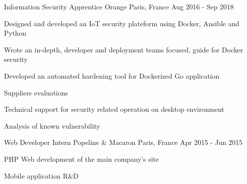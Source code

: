 

\begin{cventries}

  \cventry
    {Information Security Apprentice } %
    {Orange} %
    {Paris, France} %
    {Aug 2016 - Sep 2018} %
    {
      \begin{cvitems} %
        \item {Designed and developed an IoT security plateform using Docker, Ansible and Python}
        \item {Wrote an in-depth, developer and deployment teams focused, guide for Docker security}
        \item {Developed an automated hardening tool for Dockerized Go application}
        \item {Suppliers evaluations}
        \item {Technical support for security related operation on desktop environment}
        \item {Analysis of known vulnerability}
      \end{cvitems}
    }
  \cventry
    {Web Developer Intern} %
    {Popeline \& Macaron} %
    {Paris, France} %
    {Apr 2015 - Jun 2015} %
    {
      \begin{cvitems} %
        \item {PHP Web development of the main company's site}
        \item {Mobile application R\&D}
      \end{cvitems}
    }
\end{cventries}
